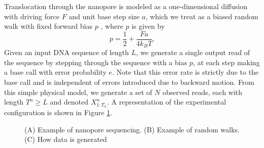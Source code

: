 \documentclass{biophys_letter}
\begin{document}
\begin{multicols}{2}
Translocation through the nanopore is modeled as a one-dimensional diffusion with driving force $F$ and unit base step size $a$, which we treat as a biased random walk with fixed forward bias $p$ \cite{Berg:1993}, where $p$ is given by
\begin{equation}
p = \frac{1}{2} + \frac{Fa}{4k_{B}T}.
\end{equation}
Given an input DNA sequence of length $L$, we generate a single output read of the sequence by stepping through the sequence with a bias $p$, at each step making a base call with error probability $e$.
Note that this error rate is strictly due to the base call and is independent of errors introduced due to backward motion. 
From this simple physical model, we generate a set of $N$ observed reads, each with length $T^{n} \ge L$ and denoted $X^n_{1:T_n}$.
A representation of the experimental configuration is shown in Figure \ref{fig:fig1}.

\end{multicols}

\twocolumn
\begin{figure}\vspace*{3pt}
\caption{(A) Example of nanopore sequencing. (B) Example of random walks. (C) How data is generated}
\label{fig:fig1}
\end{figure}
\end{document}
